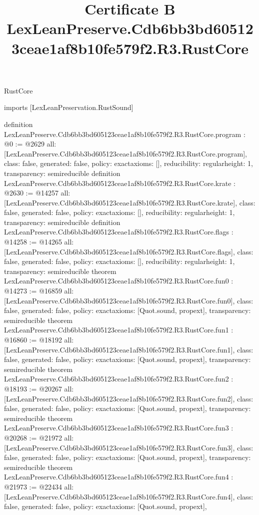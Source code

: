 \begin{lexlean}{RustCore}
\title{Certificate B LexLeanPreserve.Cdb6bb3bd605123ceae1af8b10fe579f2.R3.RustCore}
\begin{coremodule}
imports [LexLeanPreservation.RustSound]

definition LexLeanPreserve.Cdb6bb3bd605123ceae1af8b10fe579f2.R3.RustCore.program : @0 := @2629 {
  all: [LexLeanPreserve.Cdb6bb3bd605123ceae1af8b10fe579f2.R3.RustCore.program],
  class: false,
  generated: false,
  policy: exact{axioms: []},
  reducibility: regular{height: 1},
  transparency: semireducible
}
definition LexLeanPreserve.Cdb6bb3bd605123ceae1af8b10fe579f2.R3.RustCore.krate : @2630 := @14257 {
  all: [LexLeanPreserve.Cdb6bb3bd605123ceae1af8b10fe579f2.R3.RustCore.krate],
  class: false,
  generated: false,
  policy: exact{axioms: []},
  reducibility: regular{height: 1},
  transparency: semireducible
}
definition LexLeanPreserve.Cdb6bb3bd605123ceae1af8b10fe579f2.R3.RustCore.flags : @14258 := @14265 {
  all: [LexLeanPreserve.Cdb6bb3bd605123ceae1af8b10fe579f2.R3.RustCore.flags],
  class: false,
  generated: false,
  policy: exact{axioms: []},
  reducibility: regular{height: 1},
  transparency: semireducible
}
theorem LexLeanPreserve.Cdb6bb3bd605123ceae1af8b10fe579f2.R3.RustCore.fun0 : @14273 := @16859 {
  all: [LexLeanPreserve.Cdb6bb3bd605123ceae1af8b10fe579f2.R3.RustCore.fun0],
  class: false,
  generated: false,
  policy: exact{axioms: [Quot.sound, propext]},
  transparency: semireducible
}
theorem LexLeanPreserve.Cdb6bb3bd605123ceae1af8b10fe579f2.R3.RustCore.fun1 : @16860 := @18192 {
  all: [LexLeanPreserve.Cdb6bb3bd605123ceae1af8b10fe579f2.R3.RustCore.fun1],
  class: false,
  generated: false,
  policy: exact{axioms: [Quot.sound, propext]},
  transparency: semireducible
}
theorem LexLeanPreserve.Cdb6bb3bd605123ceae1af8b10fe579f2.R3.RustCore.fun2 : @18193 := @20267 {
  all: [LexLeanPreserve.Cdb6bb3bd605123ceae1af8b10fe579f2.R3.RustCore.fun2],
  class: false,
  generated: false,
  policy: exact{axioms: [Quot.sound, propext]},
  transparency: semireducible
}
theorem LexLeanPreserve.Cdb6bb3bd605123ceae1af8b10fe579f2.R3.RustCore.fun3 : @20268 := @21972 {
  all: [LexLeanPreserve.Cdb6bb3bd605123ceae1af8b10fe579f2.R3.RustCore.fun3],
  class: false,
  generated: false,
  policy: exact{axioms: [Quot.sound, propext]},
  transparency: semireducible
}
theorem LexLeanPreserve.Cdb6bb3bd605123ceae1af8b10fe579f2.R3.RustCore.fun4 : @21973 := @22434 {
  all: [LexLeanPreserve.Cdb6bb3bd605123ceae1af8b10fe579f2.R3.RustCore.fun4],
  class: false,
  generated: false,
  policy: exact{axioms: [Quot.sound, propext]},
}
\end{coremodule}
\end{lexlean}
